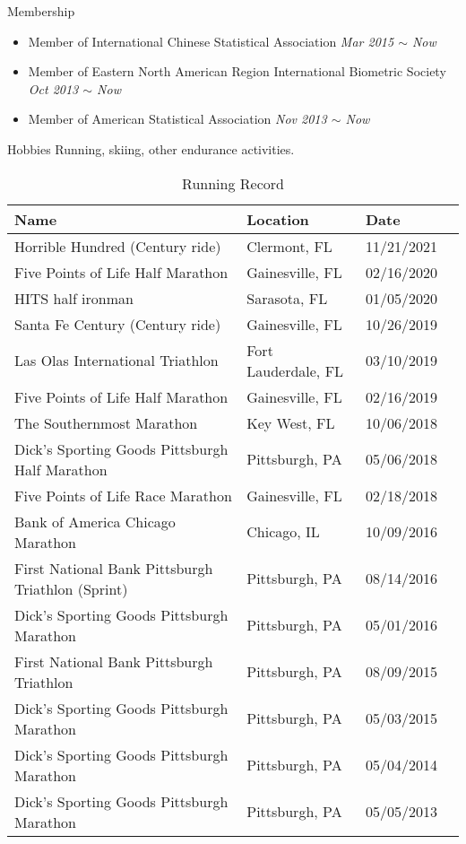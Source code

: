 \documentclass{resume} %
\begin{document}
\begin{rSection}{Membership}
\begin{itemize}[noitemsep,topsep=0pt]
\item Member of International Chinese Statistical Association
        \hfill {\em Mar 2015 $\sim$ Now} 
\item Member of Eastern North American Region International Biometric Society
        \hfill {\em Oct 2013 $\sim$ Now} 
\item Member of American Statistical Association
        \hfill {\em Nov 2013 $\sim$ Now} 
\end{itemize}
\end{rSection}


\newpage

\begin{rSection}{Hobbies}
Running, skiing, other endurance activities.

\begin{table}[htp]
\caption*{Running Record}
\begin{center}
\begin{tabular}{l l l l}
\hline
\hline
Name & Location  & Date \\
\hline
Horrible Hundred (Century ride) & Clermont, FL &  {11/21/2021} \\
Five Points of Life Half Marathon & Gainesville, FL &  {02/16/2020} \\
HITS half ironman & Sarasota, FL & 01/05/2020 \\
Santa Fe Century (Century ride)  & Gainesville, FL & 10/26/2019 \\
Las Olas International Triathlon & Fort Lauderdale, FL &  {03/10/2019} \\
Five Points of Life Half Marathon & Gainesville, FL &  {02/16/2019} \\
The Southernmost Marathon & Key West, FL &  {10/06/2018}\\
Dick's Sporting Goods Pittsburgh Half Marathon & Pittsburgh, PA &  {05/06/2018}\\
Five Points of Life Race Marathon & Gainesville, FL&   {02/18/2018}\\
Bank of America Chicago Marathon & Chicago, IL&   {10/09/2016}\\
First National Bank Pittsburgh Triathlon (Sprint) & Pittsburgh, PA &   {08/14/2016}\\
Dick's Sporting Goods Pittsburgh Marathon & Pittsburgh, PA&   {05/01/2016} \\
First National Bank Pittsburgh Triathlon & Pittsburgh, PA &  {08/09/2015}\\
Dick's Sporting Goods Pittsburgh Marathon & {Pittsburgh, PA} &  {05/03/2015}\\
Dick's Sporting Goods Pittsburgh Marathon & {Pittsburgh, PA} &    {{05/04/2014}}\\
Dick's Sporting Goods Pittsburgh Marathon & {Pittsburgh, PA} &   {05/05/2013}\\
\hline
\hline
\end{tabular}
\end{center}
\label{default}
\end{table}%



\end{rSection}
\end{document}

